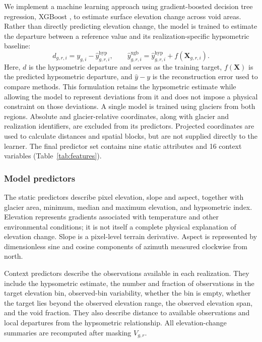\documentclass[tc,manuscript]{copernicus}
\begin{document}
We implement a machine learning approach using gradient-boosted decision tree regression, XGBoost \citep{chen2016}, to estimate surface elevation change across void areas. Rather than directly predicting elevation change, the model is trained to estimate the departure between a reference value and its realization-specific hypsometric baseline:
\begin{equation}
d_{g,r,i}=y_{g,i}-\widehat y^{\mathrm{hyp}}_{g,r,i},\qquad
\widehat y^{\mathrm{xgb}}_{g,r,i}=\widehat y^{\mathrm{hyp}}_{g,r,i}+f(\mathbf X_{g,r,i}).
\label{eq:target}
\end{equation}
Here, $d$ is the hypsometric departure and serves as the training target, $f(\mathbf X)$ is the predicted hypsometric departure, and $\widehat y-y$ is the reconstruction error used to compare methods. This formulation retains the hypsometric estimate while allowing the model to represent deviations from it and does not impose a physical constraint on those deviations. A single model is trained using glaciers from both regions. Absolute and glacier-relative coordinates, along with glacier and realization identifiers, are excluded from its predictors. Projected coordinates are used to calculate distances and spatial blocks, but are not supplied directly to the learner. The final predictor set contains nine static attributes and 16 context variables (Table~\ref{tab:features}).

\subsubsection{Model predictors}
The static predictors describe pixel elevation, slope and aspect, together with glacier area, minimum, median and maximum elevation, and hypsometric index. Elevation represents gradients associated with temperature and other environmental conditions; it is not itself a complete physical explanation of elevation change. Slope is a pixel-level terrain derivative. Aspect is represented by dimensionless sine and cosine components of azimuth measured clockwise from north.

Context predictors describe the observations available in each realization. They include the hypsometric estimate, the number and fraction of observations in the target elevation bin, observed-bin variability, whether the bin is empty, whether the target lies beyond the observed elevation range, the observed elevation span, and the void fraction. They also describe distance to available observations and local departures from the hypsometric relationship. All elevation-change summaries are recomputed after masking $V_{g,r}$.
\end{document}

